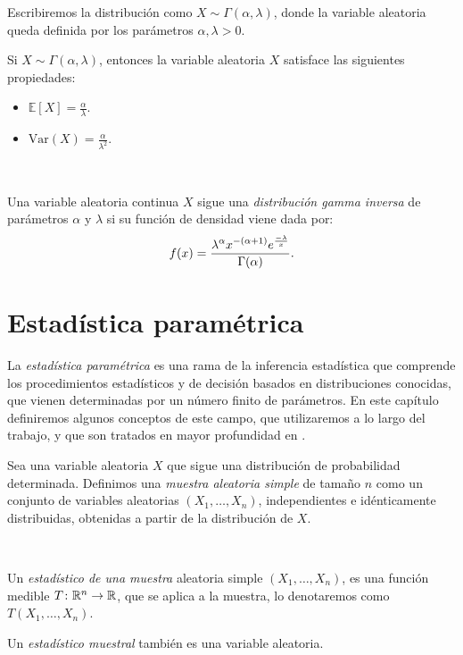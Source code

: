 \documentclass[oneside,openright,titlepage,numbers=noenddot,openany,headinclude,footinclude=true,
cleardoublepage=empty,abstractoff,BCOR=5mm,paper=a4,fontsize=12pt,main=spanish]{scrreprt}
\begin{document}
Escribiremos la distribución como $X \sim \Gamma(\alpha,\lambda)$, donde la variable aleatoria queda definida por los parámetros $\alpha,\lambda > 0$.\\

\begin{proposition}[Propiedades]
Si $X \sim \Gamma(\alpha,\lambda)$, entonces la variable aleatoria $X$ satisface las siguientes propiedades:
\begin{itemize}
    \item $\mathbb{E}[X]=\frac{\alpha}{\lambda}$.
    \item $\text{Var}(X)=\frac{\alpha}{\lambda^2}$.
\end{itemize}
\end{proposition}\

\begin{definition}
Una variable aleatoria continua $X$ sigue una \textit{distribución gamma inversa} de parámetros $\alpha$ y $\lambda$ si su función de densidad viene dada por: $$f(x)=\frac{\displaystyle \lambda^\alpha x^{-(\alpha+1)} e^{\frac{-\lambda}{x}}}{\displaystyle \Gamma(\alpha)}.$$
\end{definition}

\chapter{Estadística paramétrica} \label{ch:estapar}

La \textit{estadística paramétrica} es una rama de la inferencia estadística que comprende los procedimientos estadísticos y de decisión basados en distribuciones conocidas, que vienen determinadas por un número finito de parámetros. En este capítulo definiremos algunos conceptos de este campo, que utilizaremos a lo largo del trabajo, y que son tratados en mayor profundidad en \cite{inferencia2012}.\\

\begin{definition}
Sea una variable aleatoria $X$ que sigue una distribución de probabilidad determinada. Definimos una \textit{muestra aleatoria simple} de tamaño $n$ como un conjunto de variables aleatorias $(X_1,\dots,X_n)$, independientes e idénticamente distribuidas, obtenidas a partir de la distribución de $X$.
\end{definition}\

\begin{definition}
Un \textit{estadístico de una muestra} aleatoria simple $(X_1,\dots,X_n)$, es una función medible $T\colon \mathbb{R}^n \to \mathbb{R}$, que se aplica a la muestra, lo denotaremos como $T(X_1,\dots,X_n)$.\\
\begin{remark}
Un \textit{estadístico muestral} también es una variable aleatoria.
\end{remark}
\end{definition}\
\end{document}
